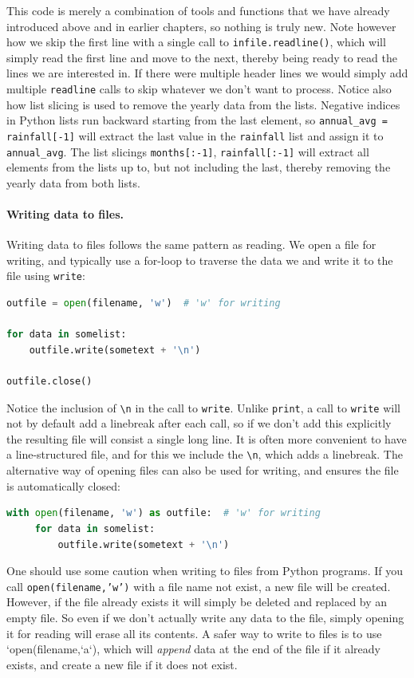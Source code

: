 \documentclass[graybox,envcountchap,sectrefs,final]{svmonodo}
\begin{document}
This code is merely a combination of tools and functions that we have already introduced above and in earlier chapters,
so nothing is truly new. Note however how we skip the first line with a single call to \texttt{infile.readline()}, which will
simply read the first line and move to the next, thereby being ready to read the lines we are interested in. If there
were multiple header lines we would simply add multiple \texttt{readline} calls to skip whatever we don't want to process.
Notice also how list slicing is used to remove the yearly data from the lists. Negative indices in Python lists run backward
starting from the last element, so \Verb!annual_avg = rainfall[-1]! will extract the last value in the \texttt{rainfall} list and assign it to
\Verb!annual_avg!. The list slicings \texttt{months[:-1]}, \texttt{rainfall[:-1]} will extract all elements from the lists up to, but not including
the last, thereby removing the yearly data from both lists.

\paragraph{Writing data to files.}
Writing data to files follows the same pattern as reading. We open a file for writing, and typically use a for-loop to traverse
the data we and write it to the file using \texttt{write}:
\begin{lstlisting}[language=Python,style=blue1]
outfile = open(filename, 'w')  # 'w' for writing

for data in somelist:
    outfile.write(sometext + '\n')

outfile.close()
\end{lstlisting}
Notice the inclusion of \Verb!\n! in the call to \texttt{write}. Unlike \texttt{print}, a call to \texttt{write} will not by default add a linebreak
after each call, so if we don't add this explicitly the resulting file will consist a single long line. It is often more
convenient to have a line-structured file, and for this we include the \Verb!\n!, which adds a linebreak. The alternative way
of opening files can also be used for writing, and ensures the file is automatically closed:
\begin{lstlisting}[language=Python,style=blue1]
with open(filename, 'w') as outfile:  # 'w' for writing
     for data in somelist:
     	 outfile.write(sometext + '\n')
\end{lstlisting}
One should use some caution when writing to files from Python programs. If you call \texttt{open(filename,'w')} with a file name
not exist, a new file will be created. However, if the file already exists it will simply be deleted and replaced by an
empty file. So even if we don't actually write any data to the file, simply opening it for reading will erase all its contents.
A safer way to write to files is to use `open(filename,`a`), which will \emph{append} data at the end of the file if it already
exists, and create a new file if it does not exist.
\end{document}
